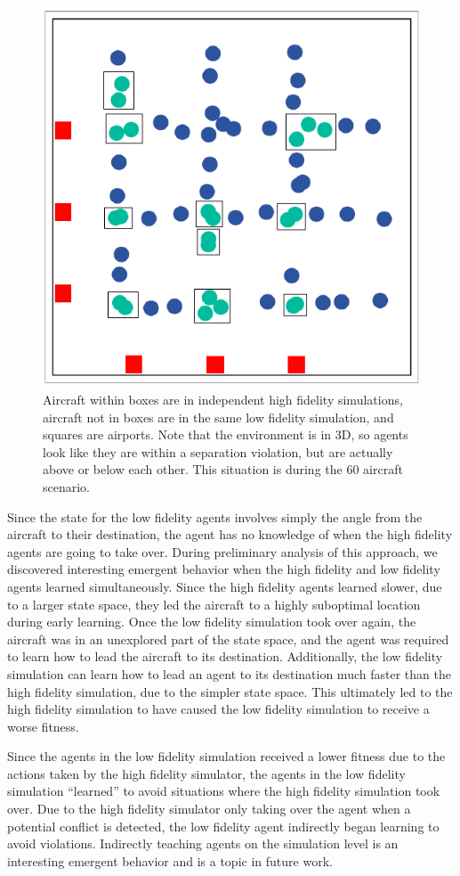 \documentclass{aamas2014}
\begin{document}
\begin{figure}
\includegraphics[width=.75\columnwidth]{Animate3d-60HF-FixedColor}
\centering
\caption{Aircraft within boxes are in independent high fidelity simulations, aircraft not in boxes are in the same low fidelity simulation, and squares are airports. Note that the environment is in 3D, so agents look like they are within a separation violation, but are actually above or below each other. This situation is during the 60 aircraft scenario.}
\label{fig:60AircraftHF}
\end{figure}

Since the state for the low fidelity agents involves simply the angle from the aircraft to their destination, the agent has no knowledge of when the high fidelity agents are going to take over. During preliminary analysis of this approach, we discovered interesting emergent behavior when the high fidelity and low fidelity agents learned simultaneously. Since the high fidelity agents learned slower, due to a larger state space, they led the aircraft to a highly suboptimal location during early learning. Once the low fidelity simulation took over again, the aircraft was in an unexplored part of the state space, and the agent was required to learn how to lead the aircraft to its destination. Additionally, the low fidelity simulation can learn how to lead an agent to its destination much faster than the high fidelity simulation, due to the simpler state space. This ultimately led to the high fidelity simulation to have caused the low fidelity simulation to receive a worse fitness. 

Since the agents in the low fidelity simulation received a lower fitness due to the actions taken by the high fidelity simulator, the agents in the low fidelity simulation ``learned'' to avoid situations where the high fidelity simulation took over. Due to the high fidelity simulator only taking over the agent when a potential conflict is detected, the low fidelity agent indirectly began learning to avoid violations. Indirectly teaching agents on the simulation level is an interesting emergent behavior and is a topic in future work.
\end{document}
